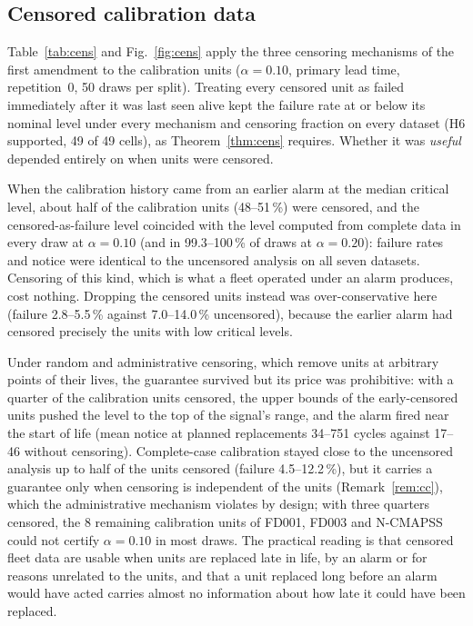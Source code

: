 \subsection{Censored calibration data}\label{sec:res-cens}

Table~\ref{tab:cens} and Fig.~\ref{fig:cens} apply the three censoring mechanisms of the first amendment to the calibration units ($\alpha=0.10$, primary lead time, repetition~0, 50 draws per split). Treating every censored unit as failed immediately after it was last seen alive kept the failure rate at or below its nominal level under every mechanism and censoring fraction on every dataset (H6 supported, 49 of 49 cells), as Theorem~\ref{thm:cens} requires. Whether it was \emph{useful} depended entirely on when units were censored.

When the calibration history came from an earlier alarm at the median critical level, about half of the calibration units (48--51\,\%) were censored, and the censored-as-failure level coincided with the level computed from complete data in every draw at $\alpha=0.10$ (and in 99.3--100\,\% of draws at $\alpha=0.20$): failure rates and notice were identical to the uncensored analysis on all seven datasets. Censoring of this kind, which is what a fleet operated under an alarm produces, cost nothing. Dropping the censored units instead was over-conservative here (failure 2.8--5.5\,\% against 7.0--14.0\,\% uncensored), because the earlier alarm had censored precisely the units with low critical levels.

Under random and administrative censoring, which remove units at arbitrary points of their lives, the guarantee survived but its price was prohibitive: with a quarter of the calibration units censored, the upper bounds of the early-censored units pushed the level to the top of the signal's range, and the alarm fired near the start of life (mean notice at planned replacements 34--751 cycles against 17--46 without censoring). Complete-case calibration stayed close to the uncensored analysis up to half of the units censored (failure 4.5--12.2\,\%), but it carries a guarantee only when censoring is independent of the units (Remark~\ref{rem:cc}), which the administrative mechanism violates by design; with three quarters censored, the 8 remaining calibration units of FD001, FD003 and N-CMAPSS could not certify $\alpha=0.10$ in most draws. The practical reading is that censored fleet data are usable when units are replaced late in life, by an alarm or for reasons unrelated to the units, and that a unit replaced long before an alarm would have acted carries almost no information about how late it could have been replaced.

